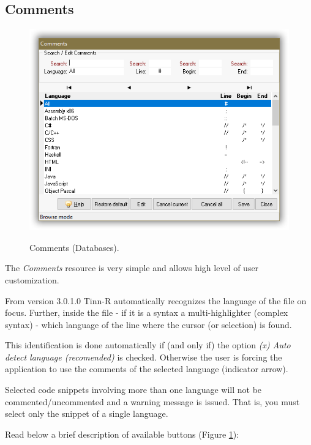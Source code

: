 \subsection{Comments}

\begin{figure}[H]
  \includegraphics[scale=0.35]{./res/comments_dlg.png}\\
  \caption{Comments (Databases).}
  \label{fig:comments_dlg}
\end{figure}

The \textit{Comments} resource is very simple and allows high level
of user customization.

From version 3.0.1.0 Tinn-R automatically recognizes the
language of the file on focus. Further, inside the file
- if it is a syntax a multi-highlighter (complex syntax) - which language of
the line where the cursor (or selection) is found.

This identification is done automatically if (and only if) the option
\textit{(x) Auto detect language (recomended)} is checked. Otherwise
the user is forcing the application to use the comments of the selected language
(indicator arrow).

Selected code snippets involving more than one language will not be commented/uncommented
and a warning message is issued. That is, you must select only the snippet of a single language.

Read below a brief description of available buttons (Figure \ref{fig:comments_dlg}):

